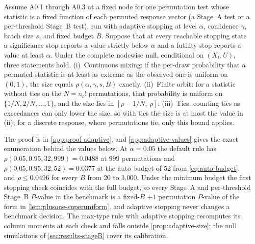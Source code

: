 \begin{proposition}
\label{prop:adaptive-size}
Assume A0.1 through A0.3 at a fixed node for one permutation test whose
statistic is a fixed function of each permuted response vector (a Stage~A test
or a per-threshold Stage~B test), run with adaptive stopping at level $\alpha$,
confidence $\gamma$, batch size $s$, and fixed budget $B$. Suppose that at every
reachable stopping state a significance stop reports a value strictly below
$\alpha$ and a futility stop reports a value at least $\alpha$. Under the
complete nodewise null, conditional on $(X_t,U)$, three statements hold.
(i)~Continuous mixing: if the per-draw probability that a permuted statistic is
at least as extreme as the observed one is uniform on $(0,1)$, the size equals
$\rho(\alpha,\gamma,s,B)$ exactly. (ii)~Finite orbit: for a statistic without ties on
the $N = n_t!$ permutations, that probability is uniform on
$\{1/N, 2/N, \dots, 1\}$, and the size lies in $[\rho - 1/N,\ \rho]$.
(iii)~Ties: counting ties as exceedances can only lower the size, so with ties
the size is at most the value in (ii); for a discrete response, where
permutations tie, only this bound applies.
\end{proposition}

The proof is in \cref{app:proof-adaptive}, and \cref{app:adaptive-values} gives
the exact enumeration behind the values below. At $\alpha=0.05$ the default
rule has $\rho(0.05,0.95,32,999)=0.0488$ at 999 permutations and
$\rho(0.05,0.95,32,52)=0.0377$ at the auto budget of 52 from
\cref{eq:auto-budget}, and $\rho\le 0.0496$ for every $B$ from 20 to 3{,}000.
Under the minimum budget the first stopping check coincides with the full
budget, so every Stage~A and per-threshold Stage~B $P$-value in the benchmark
is a fixed-$B$ $+1$ permutation $P$-value of the form in
\cref{lem:plusone-superuniform}, and adaptive stopping never changes a benchmark decision. The max-type rule with adaptive stopping
recomputes its column moments at each check and falls outside
\cref{prop:adaptive-size}; the null simulations of \cref{sec:results-stageB}
cover its calibration.
